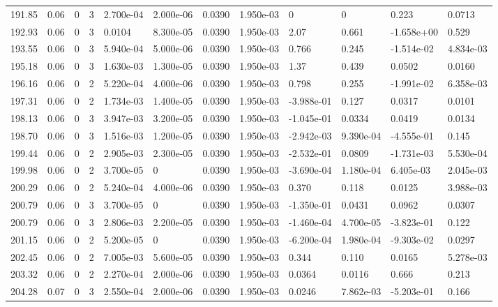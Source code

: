 \documentclass[preview]{standalone}
\begin{document}
{{{{{{{\begin{tabular}{L{1.2cm}C{1.2cm} C{0.3cm}C{0.5cm} C{1.4cm}C{1.4cm} C{1.4cm}C{1.4cm} C{1.6cm}C{1.6cm} C{1.6cm}C{1.6cm}}
  191.85  &  0.06  & 0     &  3 &  2.700e-04  & 2.000e-06  &  0.0390&   1.950e-03& 0 & 0   &  0.223 & 0.0713  \\ 
  192.93  &  0.06  & 0     &  3 &  0.0104  & 8.300e-05  &  0.0390&   1.950e-03& 2.07 & 0.661   &  -1.658e+00 & 0.529  \\ 
  193.55  &  0.06  & 0     &  3 &  5.940e-04  & 5.000e-06  &  0.0390&   1.950e-03& 0.766 & 0.245   &  -1.514e-02 & 4.834e-03  \\ 
  195.18  &  0.06  & 0     &  3 &  1.630e-03  & 1.300e-05  &  0.0390&   1.950e-03& 1.37 & 0.439   &  0.0502 & 0.0160  \\ 
  196.16  &  0.06  & 0     &  2 &  5.220e-04  & 4.000e-06  &  0.0390&   1.950e-03& 0.798 & 0.255   &  -1.991e-02 & 6.358e-03  \\ 
  197.31  &  0.06  & 0     &  2 &  1.734e-03  & 1.400e-05  &  0.0390&   1.950e-03& -3.988e-01 & 0.127   &  0.0317 & 0.0101  \\ 
  198.13  &  0.06  & 0     &  3 &  3.947e-03  & 3.200e-05  &  0.0390&   1.950e-03& -1.045e-01 & 0.0334   &  0.0419 & 0.0134  \\ 
  198.70  &  0.06  & 0     &  3 &  1.516e-03  & 1.200e-05  &  0.0390&   1.950e-03& -2.942e-03 & 9.390e-04   &  -4.555e-01 & 0.145  \\ 
  199.44  &  0.06  & 0     &  2 &  2.905e-03  & 2.300e-05  &  0.0390&   1.950e-03& -2.532e-01 & 0.0809   &  -1.731e-03 & 5.530e-04  \\ 
  199.98  &  0.06  & 0     &  2 &  3.700e-05  & 0  &  0.0390&   1.950e-03& -3.690e-04 & 1.180e-04   &  6.405e-03 & 2.045e-03  \\ 
  200.29  &  0.06  & 0     &  2 &  5.240e-04  & 4.000e-06  &  0.0390&   1.950e-03& 0.370 & 0.118   &  0.0125 & 3.988e-03  \\ 
  200.79  &  0.06  & 0     &  3 &  3.700e-05  & 0  &  0.0390&   1.950e-03& -1.350e-01 & 0.0431   &  0.0962 & 0.0307  \\ 
  200.79  &  0.06  & 0     &  3 &  2.806e-03  & 2.200e-05  &  0.0390&   1.950e-03& -1.460e-04 & 4.700e-05   &  -3.823e-01 & 0.122  \\ 
  201.15  &  0.06  & 0     &  2 &  5.200e-05  & 0  &  0.0390&   1.950e-03& -6.200e-04 & 1.980e-04   &  -9.303e-02 & 0.0297  \\ 
  202.45  &  0.06  & 0     &  2 &  7.005e-03  & 5.600e-05  &  0.0390&   1.950e-03& 0.344 & 0.110   &  0.0165 & 5.278e-03  \\ 
  203.32  &  0.06  & 0     &  2 &  2.270e-04  & 2.000e-06  &  0.0390&   1.950e-03& 0.0364 & 0.0116   &  0.666 & 0.213  \\ 
  204.28  &  0.07  & 0     &  3 &  2.550e-04  & 2.000e-06  &  0.0390&   1.950e-03& 0.0246 & 7.862e-03   &  -5.203e-01 & 0.166  \\ 
\hline 
\end{tabular} 

}}}}}}}
\end{document}
